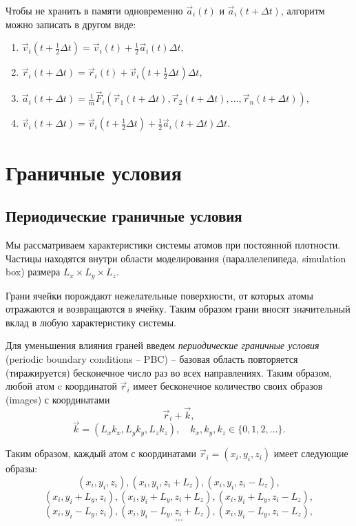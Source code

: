 \documentclass[a4paper, 12pt]{article}
\begin{document}
Чтобы не хранить в памяти одновременно $\vec{a}_i(t)$ и $\vec{a}_i(t + \Delta t)$, алгоритм можно записать в другом виде:
\begin{enumerate}
\item $\vec{v}_i(t + \frac{1}{2}\Delta t) = \vec{v}_i(t) +  \frac{1}{2}\vec{a}_i(t) \Delta t,$
\item $\vec{r}_i(t + \Delta t) = \vec{r}_i(t) +  \vec{v}_i(t + \frac{1}{2}\Delta t) \Delta t,$
\item $\vec{a}_i(t + \Delta t) = \frac{1}{m} \vec{F}_i(\vec{r}_1(t + \Delta t), \vec{r}_2(t + \Delta t), \ldots, \vec{r}_n(t + \Delta t)),$
\item $\vec{v}_i(t + \Delta t) = \vec{v}_i(t + \frac{1}{2}\Delta t) +  \frac{1}{2}  \vec{a}_i(t + \Delta t) \Delta t.$
\end{enumerate}

\section{Граничные условия}

\subsection{Периодические граничные условия}

Мы рассматриваем характеристики системы атомов при постоянной плотности. Частицы находятся внутри области моделирования (параллелепипеда, simulation box)
размера $L_x \times L_y \times L_z$. 

Грани ячейки порождают нежелательные поверхности, от которых атомы отражаются и возвращаются в ячейку.  Таким образом грани вносят значительный вклад в любую характеристику системы.

Для уменьшения влияния граней введем \textit{периодические граничные условия} (periodic boundary conditions -- PBC) -- базовая область повторяется (тиражируется) бесконечное число раз во всех направлениях. Таким образом, любой атом c координатой $\vec{r}_i$ имеет бесконечное количество своих образов (images) с координатами 
\begin{equation}
\vec{r}_i + \vec{k},
\end{equation}
\begin{equation}
\vec{k}=(L_x k_x, L_y k_y, L_z k_z), \quad k_x, k_y, k_z \in \{0, 1, 2, \ldots \}.
\end{equation}

Таким образом, каждый атом с координатами $\vec{r}_i = (x_i, y_i, z_i)$ имеет следующие образы:
\begin{equation*}
(x_i, y_i, z_i), (x_i, y_i, z_i + L_z), (x_i, y_i, z_i - L_z),
\end{equation*}
\begin{equation*}
(x_i, y_i + L_y, z_i), (x_i, y_i + L_y, z_i + L_z), (x_i, y_i + L_y, z_i - L_z),
\end{equation*}
\begin{equation*}
(x_i, y_i - L_y, z_i), (x_i, y_i - L_y, z_i + L_z), (x_i, y_i - L_y, z_i - L_z),
\end{equation*}
\begin{equation*}
\cdots
\end{equation*}
\end{document}
